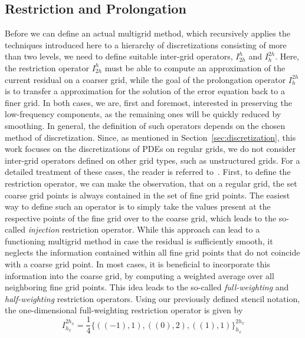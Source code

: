 \subsection{Restriction and Prolongation}
\label{subsec:restriction-and-prolongation}
Before we can define an actual multigrid method, which recursively applies the techniques introduced here to a hierarchy of discretizations consisting of more than two levels, we need to define suitable inter-grid operators, $I_{2h}^{h}$ and $I_{h}^{2h}$.
Here, the restriction operator $I_{2h}^{h}$ must be able to compute an approximation of the current residual on a coarser grid, while the goal of the prolongation operator $I_{h}^{2h}$ is to transfer a approximation for the solution of the error equation back to a finer grid.
In both cases, we are, first and foremost, interested in preserving the low-frequency components, as the remaining ones will be quickly reduced by smoothing.
In general, the definition of such operators depends on the chosen method of discretization. 
Since, as mentioned in Section~\ref{sec:discretization}, this work focuses on the discretizations of PDEs on regular grids, we do not consider inter-grid operators defined on other grid types, such as unstructured grids.
For a detailed treatment of these cases, the reader is referred to~\cite{trottenberg2000multigrid,ruge1987algebraic,stuben2001introduction}.%
First, to define the restriction operator, we can make the observation, that on a regular grid, the set coarse grid points is always contained in the set of fine grid points.
The easiest way to define such an operator is to simply take the values present at the respective points of the fine grid over to the coarse grid, which leads to the so-called \emph{injection} restriction operator.
While this approach can lead to a functioning multigrid method in case the residual is sufficiently smooth, it neglects the information contained within all fine grid points that do not coincide with a coarse grid point.
In most cases, it is beneficial to incorporate this information into the coarse grid, by computing a weighted average over all neighboring fine grid points.
This idea leads to the so-called \emph{full-weighting} and \emph{half-weighting} restriction operators.
Using our previously defined stencil notation, the one-dimensional full-weighting restriction operator is given by
\begin{equation}
	I_{h_x}^{2 h_x} = \frac{1}{4}\{((-1), 1), ((0), 2), ((1), 1)\}_{h_x}^{2h_x}
\end{equation} 

